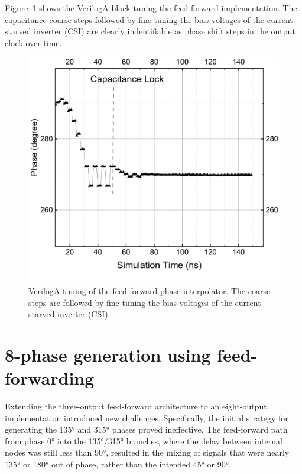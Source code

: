 Figure~\ref{fig:FF_half_veriloga_tuning} shows the VerilogA block tuning the feed-forward implementation. The capacitance coarse steps followed by fine-tuning the bias voltages of the current-starved inverter (CSI) are clearly indentifiable as phase shift steps in the output clock over time.

\begin{figure}[H]
  \centering
  \includegraphics[width=0.8\linewidth]{figures/Results/FF_3out_CSI_dynamicTuning-225And270TuningCapAndVb.png}
  \caption{VerilogA tuning of the feed-forward phase interpolator. The coarse steps are followed by fine-tuning the bias voltages of the current-starved inverter (CSI).}
  \label{fig:FF_half_veriloga_tuning}
\end{figure}

\section{8-phase generation using feed-forwarding}\label{sec:8phase_FF}

Extending the three-output feed-forward architecture to an eight-output implementation introduced new challenges. Specifically, the initial strategy for generating the \ang{135} and \ang{315} phases proved ineffective. The feed-forward path from phase \ang{0} into the \ang{135}/\ang{315} branches, where the delay between internal nodes was still less than \ang{90}, resulted in the mixing of signals that were nearly \ang{135} or \ang{180} out of phase, rather than the intended \ang{45} or \ang{90}.

